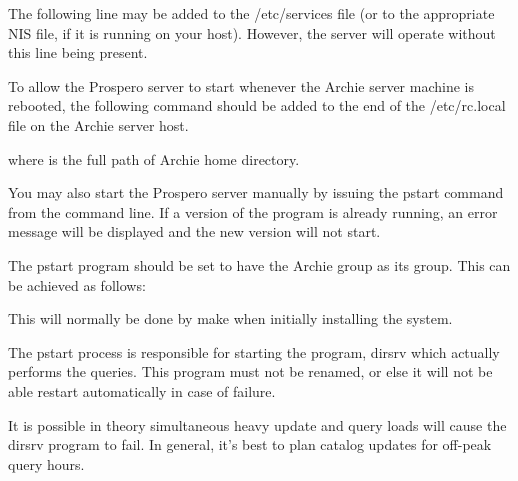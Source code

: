 

The following line may be added to the /etc/services file (or to the
appropriate NIS file, if it is running on your host). However, the server will
operate without this line being present.






To allow the Prospero server to start whenever the Archie server machine is
rebooted, the following command should be added to the end of the
/etc/rc.local file on the Archie server host.


where  is the full path of Archie home directory.

You may also start the Prospero server manually by issuing the pstart command
from the command line. If a version of the program is already running, an
error message will be displayed and the new version will not start.

The pstart program should be set to have the Archie group as its group. This
can be achieved as follows:


This will normally be done by make when initially installing the system.

The pstart process is responsible for starting the program, dirsrv which
actually performs the queries. This program must not be renamed, or else it
will not be able restart automatically in case of failure.







It is possible in theory simultaneous heavy update and query loads will cause
the dirsrv program to fail. In general, it's best to plan catalog updates for
off-peak query hours.




